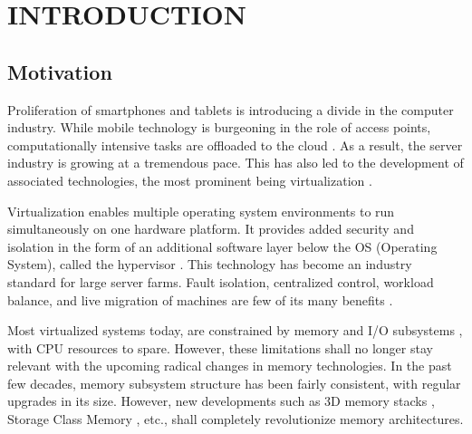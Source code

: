 %
%
%



\pagestyle{plain} %
\setcounter{page}{1}


\chapter{\uppercase {Introduction}}

\section{Motivation}
Proliferation of smartphones and tablets is introducing a divide in the computer industry. While mobile technology is burgeoning in the role of access points, computationally intensive tasks are offloaded to the cloud \cite{virt_benefits}. As a result, the server industry is growing at a tremendous pace. This has also led to the development of associated technologies, the most prominent being virtualization \cite{virt_back}.

Virtualization enables multiple operating system environments to run simultaneously on one hardware platform. It provides added security and isolation in the form of an additional software layer below the OS (Operating System), called the hypervisor \cite{virt_arch}. This technology has become an industry standard for large server farms. Fault isolation, centralized control, workload balance, and live migration of machines are few of its many benefits \cite{virt_back}.

Most virtualized systems today, are constrained by memory and I/O subsystems \cite{virt_io_bottleneck} \cite{virt_bottleneck} \cite{virt_io_bottleneck2}, with CPU resources to spare. However, these limitations shall no longer stay relevant with the upcoming radical changes in memory technologies. In the past few decades, memory subsystem structure has been fairly consistent, with regular upgrades in its size. However, new developments such as 3D memory stacks \cite{mem_3d1} \cite{mem_3d2}, Storage Class Memory \cite{scm1} \cite{scm2}, etc., shall completely revolutionize memory architectures.

